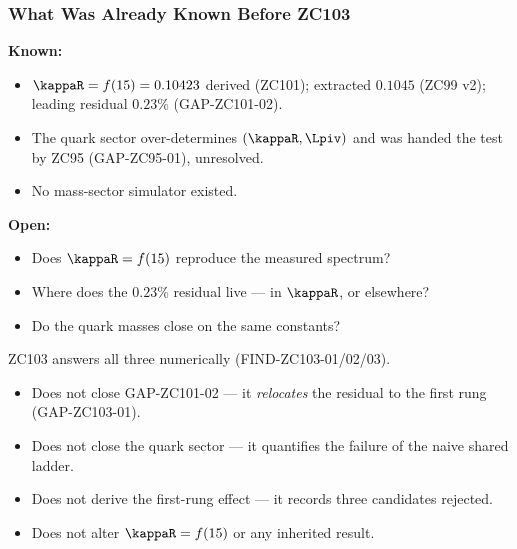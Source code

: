 \documentclass[12pt, a4paper]{article}
\begin{document}
\subsubsection{What Was Already Known Before ZC103}

\begin{keybox}[title={Pre-ZC103 Status}]
\textbf{Known:}
\begin{itemize}[leftmargin=2em, noitemsep]
  \item $\kappaR=f(15)=0.10423$ derived (ZC101); extracted $0.1045$ (ZC99 v2);
    leading residual $0.23\%$ (GAP-ZC101-02).
  \item The quark sector over-determines $(\kappaR,\Lpiv)$ and was handed the
    test by ZC95 (GAP-ZC95-01), unresolved.
  \item No mass-sector simulator existed.
\end{itemize}

\textbf{Open:}
\begin{itemize}[leftmargin=2em, noitemsep]
  \item Does $\kappaR=f(15)$ reproduce the measured spectrum?
  \item Where does the $0.23\%$ residual live --- in $\kappaR$, or elsewhere?
  \item Do the quark masses close on the same constants?
\end{itemize}

ZC103 answers all three numerically (FIND-ZC103-01/02/03).
\end{keybox}

\begin{keybox}[title={What ZC103 Does NOT Do}]
\begin{itemize}[leftmargin=2em, noitemsep]
  \item Does not close GAP-ZC101-02 --- it \emph{relocates} the residual to the
    first rung (GAP-ZC103-01).
  \item Does not close the quark sector --- it quantifies the failure of the
    naive shared ladder.
  \item Does not derive the first-rung effect --- it records three candidates
    rejected.
  \item Does not alter $\kappaR=f(15)$ or any inherited result.
\end{itemize}
\end{keybox}
\end{document}
